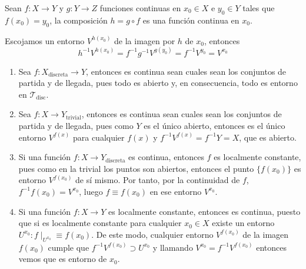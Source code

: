 \begin{prop}
Sean $f:X \rightarrow Y$ y $g: Y \rightarrow Z$ funciones continuas en $x_0\in X$ e $y_0\in Y$ tales que $f(x_0) = y_0$, la composición $h = g \circ f$ es una función continua en $x_0$.
\end{prop}
\begin{demo}
Escojamos un entorno $V^{h\left( x_0 \right)}$ de la imagen por $h$ de $x_0$, entonces
\[
h^{-1} V^{h\left( x_0 \right)} = f^{-1}g^{-1}V^{g\left( y_0 \right)} = f^{-1} V^{y_0} = V^{x_0}
\]
\end{demo}

\begin{ej}
\begin{enumerate}
    \item Sea $f: X_{\text{discreta}} \rightarrow Y$, entonces es continua sean cuales sean los conjuntos de partida y de llegada, pues todo es abierto y, en consecuencia, todo es entorno en $\mathcal{T}_{\text{disc}}$.
    \item Sea $f: X \rightarrow Y_{\text{trivial}}$, entonces es continua sean cuales sean los conjuntos de partida y de llegada, pues como $Y$ es el único abierto, entonces es el único entorno $V^{f\left( x \right)}$ para cualquier $f(x)$ y $f^{-1}V^{f\left( x \right)} = f^{-1}Y = X$, que es abierto.
    \item Si una función $f: X \rightarrow Y_{\text{discreta}}$ es continua, entonces $f$ es localmente constante, pues como en la trivial los puntos son abiertos, entonces el punto $\{f\left( x_0 \right)\}$ es entorno $V^{f\left( x_0 \right)}$ de sí mismo. Por tanto, por la continuidad de $f$, $f^{-1}f\left( x_0 \right) = V^{x_0}$, luego $f \equiv f\left( x_0 \right)$ en ese entorno $V^{x_0}$.
    \item Si una función $f: X \rightarrow Y$ es localmente constante, entonces es continua, puesto que si es localmente constante para cualquier $x_0 \in X$ existe un entorno $U^{x_0} : f\mid_{U^{x_0}} \equiv f\left( x_0 \right)$. De este modo, cualquier entorno $V^{f\left( x_0 \right)}$ de la imagen $f(x_0)$ cumple que $f^{-1}V^{f\left( x_0 \right)} \supset U^{x_0}$ y llamando $V^{x_0} = f^{-1} V^{f\left( x_0 \right)}$ entonces vemos que es entorno de $x_0$.
\end{enumerate}
\end{ej}

